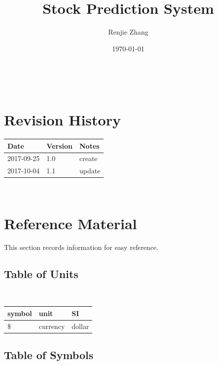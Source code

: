 \documentclass[12pt]{article}
\begin{document}
\title{Stock Prediction System} 
\author{Renjie Zhang}
\date{\today}
\maketitle

~\newpage


\section{Revision History}

\begin{tabularx}{\textwidth}{p{3cm}p{2cm}X}
\toprule {\bf Date} & {\bf Version} & {\bf Notes}\\
\midrule
2017-09-25 & 1.0 & create\\
2017-10-04 & 1.1 & update\\
\bottomrule
\end{tabularx}

~\newpage

\section{Reference Material}

This section records information for easy reference.

\subsection{Table of Units}

~\newline

\renewcommand{\arraystretch}{1.2}
\noindent \begin{tabular}{l l l} 
\toprule 
\textbf{symbol} & \textbf{unit} & \textbf{SI}\\
\midrule 
\si{\$} & currency & dollar\\

\bottomrule
\end{tabular}


\subsection{Table of Symbols}
\end{document}
